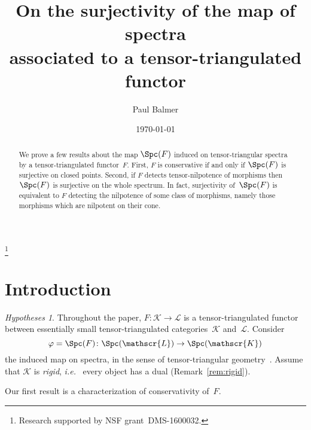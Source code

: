 \documentclass{amsart}
\numberwithin{equation}{section}
\theoremstyle{remark}
\newtheorem{Hyp}[equation]{Hypotheses}
\begin{document}
\title[On surjectivity on tensor-triangular spectra]{On the surjectivity of the map of spectra\\associated to a tensor-triangulated functor}
\author{Paul Balmer}
\date{\today}

\address{Paul Balmer, Mathematics Department, UCLA, Los Angeles, CA 90095-1555, USA}

\begin{abstract}
We prove a few results about the map $\Spc(F)$ induced on tensor-triangular spectra by a tensor-triangulated functor~$F$. First, $F$ is conservative if and only if $\Spc(F)$ is surjective on closed points. Second, if $F$ detects tensor-nilpotence of morphisms then $\Spc(F)$ is surjective on the whole spectrum. In fact, surjectivity of~$\Spc(F)$ is equivalent to $F$ detecting the nilpotence of some class of morphisms, namely those morphisms which are nilpotent on their cone.
\end{abstract}


\thanks{Research supported by NSF grant~DMS-1600032.}

\maketitle

\section{Introduction}

\begin{Hyp}
\label{hyp}Throughout the paper, $F\colon{\mathscr{{K}}}\to {\mathscr{{L}}}$ is a tensor-triangulated functor between essentially small tensor-triangulated categories~${\mathscr{{K}}}$ and~${\mathscr{{L}}}$. Consider
\[
\varphi=\Spc(F)\colon {\Spc({\mathscr{L}})}\to {\Spc({\mathscr{K}})}
\]
the induced map on spectra, in the sense of tensor-triangular geometry~\cite{Balmer05a,BalmerICM,Stevenson16pp}.
Assume that ${\mathscr{{K}}}$ is \emph{rigid}, {{\sl i.e.}\ } every object has a dual (Remark~\ref{rem:rigid}).
\end{Hyp}

Our first result is a characterization of conservativity of~$F$.
\end{document}
